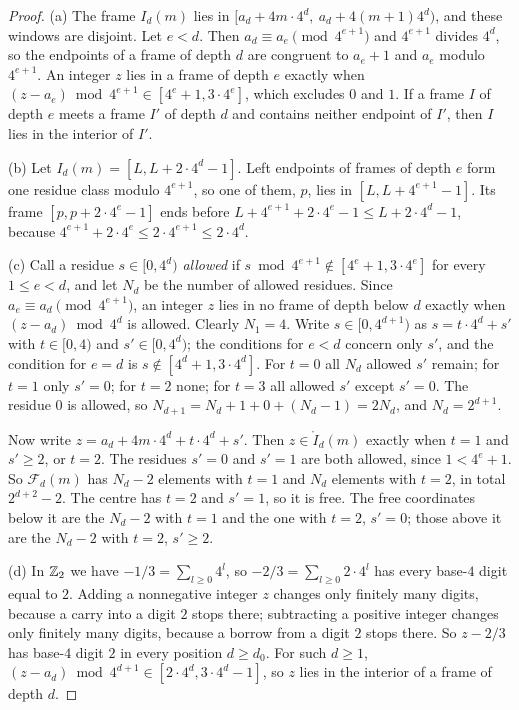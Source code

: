 \begin{proof}
(a) The frame $I_d(m)$ lies in $[a_d+4m\cdot4^d,\ a_d+4(m+1)4^d)$, and these windows are disjoint. Let $e<d$. Then $a_d\equiv a_e\pmod{4^{e+1}}$ and $4^{e+1}$ divides $4^d$, so the endpoints of a frame of depth $d$ are congruent to $a_e+1$ and $a_e$ modulo $4^{e+1}$. An integer $z$ lies in a frame of depth $e$ exactly when $(z-a_e)\bmod4^{e+1}\in[4^e+1,3\cdot4^e]$, which excludes $0$ and $1$. If a frame $I$ of depth $e$ meets a frame $I'$ of depth $d$ and contains neither endpoint of $I'$, then $I$ lies in the interior of $I'$.

(b) Let $I_d(m)=[L,L+2\cdot4^d-1]$. Left endpoints of frames of depth $e$ form one residue class modulo $4^{e+1}$, so one of them, $p$, lies in $[L,L+4^{e+1}-1]$. Its frame $[p,p+2\cdot4^e-1]$ ends before $L+4^{e+1}+2\cdot4^e-1\le L+2\cdot4^d-1$, because $4^{e+1}+2\cdot4^e\le2\cdot4^{e+1}\le2\cdot4^d$.

(c) Call a residue $s\in[0,4^d)$ \emph{allowed} if $s\bmod4^{e+1}\notin[4^e+1,3\cdot4^e]$ for every $1\le e<d$, and let $N_d$ be the number of allowed residues. Since $a_e\equiv a_d\pmod{4^{e+1}}$, an integer $z$ lies in no frame of depth below $d$ exactly when $(z-a_d)\bmod4^d$ is allowed. Clearly $N_1=4$. Write $s\in[0,4^{d+1})$ as $s=t\cdot4^d+s'$ with $t\in[0,4)$ and $s'\in[0,4^d)$; the conditions for $e<d$ concern only $s'$, and the condition for $e=d$ is $s\notin[4^d+1,3\cdot4^d]$. For $t=0$ all $N_d$ allowed $s'$ remain; for $t=1$ only $s'=0$; for $t=2$ none; for $t=3$ all allowed $s'$ except $s'=0$. The residue $0$ is allowed, so $N_{d+1}=N_d+1+0+(N_d-1)=2N_d$, and $N_d=2^{d+1}$.

Now write $z=a_d+4m\cdot4^d+t\cdot4^d+s'$. Then $z\in\mathring I_d(m)$ exactly when $t=1$ and $s'\ge2$, or $t=2$. The residues $s'=0$ and $s'=1$ are both allowed, since $1<4^e+1$. So $\mathcal F_d(m)$ has $N_d-2$ elements with $t=1$ and $N_d$ elements with $t=2$, in total $2^{d+2}-2$. The centre has $t=2$ and $s'=1$, so it is free. The free coordinates below it are the $N_d-2$ with $t=1$ and the one with $t=2$, $s'=0$; those above it are the $N_d-2$ with $t=2$, $s'\ge2$.

(d) In $\mathbb{Z}_2$ we have $-1/3=\sum_{l\ge0}4^l$, so $-2/3=\sum_{l\ge0}2\cdot4^l$ has every base-$4$ digit equal to $2$. Adding a nonnegative integer $z$ changes only finitely many digits, because a carry into a digit $2$ stops there; subtracting a positive integer changes only finitely many digits, because a borrow from a digit $2$ stops there. So $z-2/3$ has base-$4$ digit $2$ in every position $d\ge d_0$. For such $d\ge1$, $(z-a_d)\bmod4^{d+1}\in[2\cdot4^d,3\cdot4^d-1]$, so $z$ lies in the interior of a frame of depth $d$.
\end{proof}

